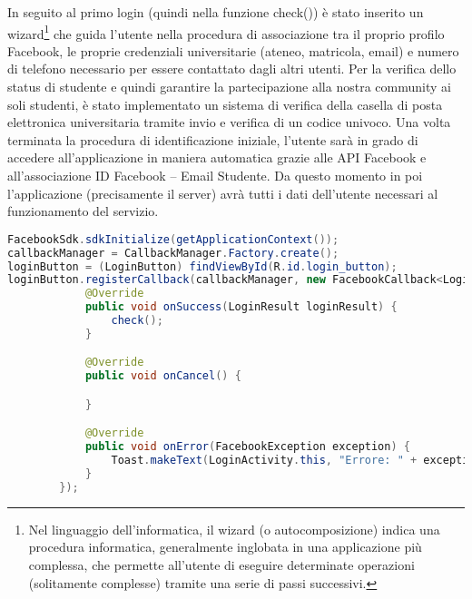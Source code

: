 In seguito al primo login (quindi nella funzione check()) è stato inserito un wizard\footnote{Nel linguaggio dell'informatica, il wizard (o autocomposizione) indica una procedura informatica, generalmente inglobata in una applicazione più complessa, che permette all'utente di eseguire determinate operazioni (solitamente complesse) tramite una serie di passi successivi.} che guida l’utente nella procedura di associazione tra il proprio profilo Facebook, le proprie credenziali universitarie (ateneo, matricola, email) e numero di telefono necessario per essere contattato dagli altri utenti.
Per la verifica dello status di studente e quindi garantire la partecipazione alla nostra community ai soli studenti, è stato implementato un sistema di verifica della casella di posta elettronica universitaria tramite invio e verifica di un codice univoco. Una volta terminata la procedura di identificazione iniziale, l’utente sarà in grado di accedere all’applicazione in maniera automatica grazie alle API Facebook e all’associazione ID Facebook – Email Studente.
Da questo momento in poi l'applicazione (precisamente il server) avrà tutti i dati dell'utente necessari al funzionamento del servizio.

\bigskip
\begin{minipage}{\linewidth}
\begin{lstlisting}[language=Java, caption=Esempio Facebook callback, label={lst:callback}]
FacebookSdk.sdkInitialize(getApplicationContext());
callbackManager = CallbackManager.Factory.create();
loginButton = (LoginButton) findViewById(R.id.login_button);
loginButton.registerCallback(callbackManager, new FacebookCallback<LoginResult>() {
            @Override
            public void onSuccess(LoginResult loginResult) {
                check();
            }

            @Override
            public void onCancel() {

            }

            @Override
            public void onError(FacebookException exception) {
                Toast.makeText(LoginActivity.this, "Errore: " + exception,Toast.LENGTH_LONG).show();
            }
        });
\end{lstlisting}
\end{minipage}
\FloatBarrier

